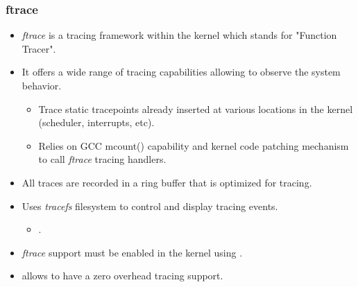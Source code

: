 \begin{frame}
  \frametitle{ftrace}
  \begin{itemize}
    \item {\em ftrace} is a tracing framework within the kernel which stands for
          "Function Tracer".
    \item It offers a wide range of tracing capabilities allowing to observe the
          system behavior.
    \begin{itemize}
      \item Trace static tracepoints already inserted at various locations
            in the kernel (scheduler, interrupts, etc).
      \item Relies on GCC mcount() capability and kernel code patching mechanism
            to call {\em ftrace} tracing handlers.
    \end{itemize}
    \item All traces are recorded in a ring buffer that is optimized for tracing.
    \item Uses {\em tracefs} filesystem to control and display tracing events.
    \begin{itemize}
      \item {}.
    \end{itemize}
    \item {\em ftrace} support must be enabled in the kernel using
          .
    \item {} allows to have a zero overhead tracing
          support.
  \end{itemize}
\end{frame}

